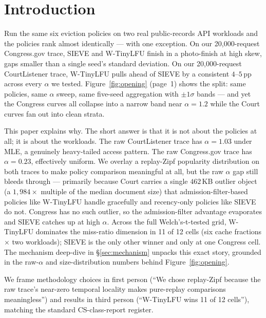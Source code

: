 \section{Introduction}

Run the same six eviction policies on two real public-records API workloads
and the policies rank almost identically --- with one exception. On our
20{,}000-request Congress.gov trace, SIEVE and W-TinyLFU finish in a
photo-finish at high skew, gaps smaller than a single seed's standard
deviation. On our 20{,}000-request CourtListener trace, W-TinyLFU pulls
ahead of SIEVE by a consistent $4$--$5$\,pp across every $\alpha$ we tested.
Figure~\ref{fig:opening} (page~1) shows the split: same policies, same
$\alpha$ sweep, same five-seed aggregation with $\pm 1\sigma$ bands --- and
yet the Congress curves all collapse into a narrow band near
$\alpha = 1.2$ while the Court curves fan out into clean strata.

This paper explains why. The short answer is that it is not about the
policies at all; it is about the workloads. The raw CourtListener trace
has $\alpha = 1.03$ under MLE, a genuinely heavy-tailed access pattern.
The raw Congress.gov trace has $\alpha = 0.23$, effectively uniform. We
overlay a replay-Zipf popularity distribution on both traces to make
policy comparison meaningful at all, but the raw $\alpha$ gap still bleeds
through --- primarily because Court carries a single $462$\,KB outlier
object (a $1{,}984\times$ multiple of the median document size) that
admission-filter-based policies like W-TinyLFU handle gracefully and
recency-only policies like SIEVE do not. Congress has no such outlier,
so the admission-filter advantage evaporates and SIEVE catches up at
high $\alpha$. Across the full Welch's-t-tested grid, W-TinyLFU dominates
the miss-ratio dimension in 11 of 12 cells (six cache fractions $\times$
two workloads); SIEVE is the only other winner and only at one Congress
cell. The mechanism deep-dive in \S\ref{sec:mechanism} unpacks this
exact story, grounded in the raw-$\alpha$ and size-distribution numbers
behind Figure~\ref{fig:opening}.

We frame methodology choices in first person (``We chose replay-Zipf
because the raw trace's near-zero temporal locality makes pure-replay
comparisons meaningless'') and results in third person (``W-TinyLFU
wins 11 of 12 cells''), matching the standard CS-class-report register.

